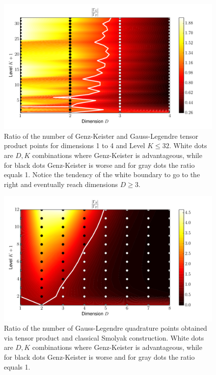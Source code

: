 \documentclass[a4paper,10pt]{article}
\begin{document}
\begin{figure}
  \centering
  \includegraphics[width=0.8\linewidth]{./img/gk_legendre_ratio_large.pdf}
  \caption{Ratio of the number of Genz-Keister and Gauss-Legendre tensor product
  points for dimensions 1 to 4 and Level $K \leq 32$. White dots are $D,K$
  combinations where Genz-Keister is advantageous, while for black dots
  Genz-Keister is worse and for gray dots the ratio equals 1. Notice the tendency
  of the white boundary to go to the right and eventually reach dimensions $D \geq 3$.}
  \label{fig:gk_legendre_ratio_large}
\end{figure}

\begin{figure}
  \centering
  \includegraphics[width=0.8\linewidth]{./img/smol_legendre_ratio.pdf}
  \caption{Ratio of the number of Gauss-Legendre quadrature points obtained
  via tensor product and classical Smolyak construction. White dots are $D,K$
  combinations where Genz-Keister is advantageous, while for black dots
  Genz-Keister is worse and for gray dots the ratio equals 1.}
  \label{fig:smol_legendre_ratio}
\end{figure}
\end{document}
